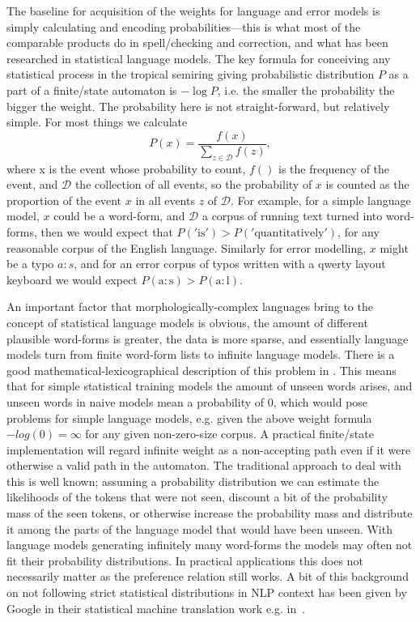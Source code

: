 \documentclass[officiallayout]{unihelcompling}
\begin{document}
The baseline for acquisition of the weights for language and error models is
simply calculating and encoding probabilities---this is what most of the
comparable products do in spell\-/checking and correction, and what has been
researched in statistical language models. The key formula for conceiving any
statistical process in the tropical semiring giving probabilistic distribution
$P$ as a part of a finite\-/state automaton is $-\log P$, i.e. the smaller the
probability the bigger the weight. The probability here is not
straight-forward, but relatively simple. For most things we calculate 
\begin{equation}
    P(x) = \frac{f(x)}{\sum_{z \in \mathcal{D}} f(z)},
\end{equation}
where x is the event whose probability to count, $f()$ is the frequency of the
event, and $\mathcal{D}$ the collection of all events, so the probability of
$x$ is counted as the proportion of the event $x$ in all events $z$ of
$\mathcal{D}$. For example, for a simple language model, $x$ could be a
word-form, and $\mathcal{D}$ a corpus of running text turned into word-forms,
then we would expect that $P('\mathrm{is}') > P('\mathrm{quantitatively}')$,
for any reasonable corpus of the English language. Similarly for error
modelling, $x$ might be a typo $a:s$, and for an error corpus of typos written
with a qwerty layout keyboard we would expect $P(\mathrm{a}:\mathrm{s}) >
P(\mathrm{a}:\mathrm{l})$.

An important factor that morphologically-complex languages bring to the concept
of statistical language models is obvious, the amount of different plausible
word-forms is greater, the data is more sparse, and essentially language models
turn from finite word-form lists to infinite language models.  There is a good
mathematical-lexicographical description of this problem in
\citep{kornai2002many}. This means that for simple statistical training models
the amount of unseen words arises, and unseen words in naive models mean a
probability of $0$, which would pose problems for simple language models, e.g.
given the above weight formula $-log(0) = \infty$ for any given non-zero-size
corpus. A practical finite\-/state implementation will regard infinite weight as
a non-accepting path even if it were otherwise a valid path in the automaton.
The traditional approach to deal with this is well known; assuming a
probability distribution we can estimate the likelihoods of the tokens that
were not seen, discount a bit of the probability mass of the seen tokens, or
otherwise increase the probability mass and distribute it among the parts of
the language model that would have been unseen. With language models generating
infinitely many word-forms the models may often not fit their probability
distributions. In practical applications this does not necessarily matter as
the preference relation still works. A bit of this background on not following
strict statistical distributions in NLP context has been given by Google in
their statistical machine translation work e.g.  in~\citet{brants2007large}.
\end{document}
